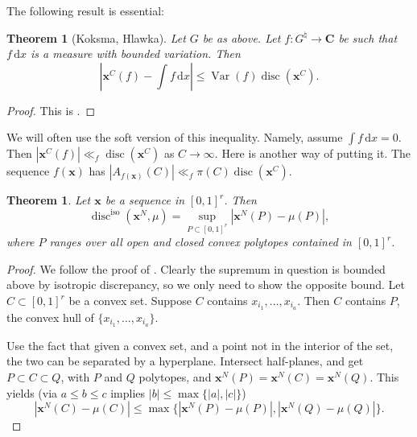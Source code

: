 \documentclass{article}
\DeclareMathOperator{\disc}{disc}
\DeclareMathOperator{\Var}{Var}
\newcommand{\bC}{\mathbf{C}}
\newcommand{\bx}{{\boldsymbol x}}
\newcommand{\dd}{\mathrm{d}}
\newcommand{\iso}{\mathrm{iso}}
\newtheorem{theorem}[subsection]{Theorem}
\theoremstyle{definition}
\begin{document}
The following result is essential:

\begin{theorem}[Koksma, Hlawka]
Let $G$ be as above. Let $f\colon G^\natural\to \bC$ be such that $f\, \dd x$ 
is a measure with bounded variation. Then 
\[
	\left|\bx^C(f) - \int f\, \dd x\right| \leqslant \Var(f) \disc(\bx^C) .
\]
\end{theorem}
\begin{proof}
This is \cite[Th.~3.2]{okten-1999}. 
\end{proof}

We will often use the soft version of this inequality. Namely, assume 
$\int f\, \dd x=0$. Then $|\bx^C(f)| \ll_f \disc(\bx^C)$ as $C\to \infty$. 
Here is another way of putting it. The sequence $f(\bx)$ has
$|A_{f(\bx)}(C)| \ll_f \pi(C) \disc(\bx^C)$. 

\begin{theorem}
Let $\bx$ be a sequence in $[0,1]^r$. Then 
\[
	\disc^\iso(\bx^N,\mu) = \sup_{P\subset [0,1]^r} \left| \bx^N(P)-\mu(P)\right| ,
\]
where $P$ ranges over all open and closed convex polytopes contained in 
$[0,1]^r$. 
\end{theorem}
\begin{proof}
We follow the proof of \cite[Ch.2~Th.1.5]{kuipers-niederreiter-1974}. Clearly 
the supremum in question is bounded above by isotropic discrepancy, so we only 
need to show the opposite bound. Let $C\subset [0,1]^r$ be a convex 
set. Suppose $C$ contains $x_{i_1},\dots,x_{i_a}$. Then $C$ contains $P$, the 
convex hull of $\{x_{i_1},\dots,x_{i_a}\}$. 

Use the fact that given a convex set, and a point not in the interior of the 
set, the two can be separated by a hyperplane. Intersect half-planes, and get 
$P\subset C\subset Q$, with $P$ and $Q$ polytopes, and 
$\bx^N(P)=\bx^N(C)=\bx^N(Q)$. This yields (via $a\leqslant b\leqslant c$ implies 
$|b|\leqslant\max\{|a|,|c|\}$)
\[
	|\bx^N(C)-\mu(C)| \leqslant \max\{|\bx^N(P)-\mu(P)|,|\bx^N(Q)-\mu(Q)|\} .
\]
\end{proof}
\end{document}

